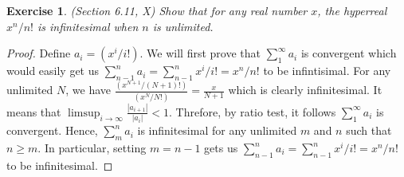 \documentclass[a4paper, 11pt]{book}
\theoremstyle{plain}
\newtheorem{exercise}{Exercise}[chapter]
\theoremstyle{plain}
\newcommand{\arr}{\rightarrow}
\begin{document}
  \begin{exercise}
    (Section 6.11, X)
     Show that for any real number $x$, the hyperreal $x^n/n!$ is infinitesimal when $n$ is unlimited.
  \end{exercise}
  \begin{proof}
    Define $a_i=(x^i/i!)$. We will first prove that $\sum_{1}^\infty a_i$ is convergent which would easily get us $\sum_{n-1}^n a_i= \sum_{n-1}^n x^i/i!=x^n/n!$ to be infintisimal. For any unlimited $N$, we have $\frac{(x^{N+1}/(N+1)!)}{(x^N/N!)}=\frac{x}{N+1}$ which is clearly infinitesimal. It means that $\limsup_{i \arr \infty} \frac{|a_{i+1}|}{|a_i|}<1$. Threfore, by ratio test, it follows $\sum_{1}^{\infty} a_i$ is convergent. Hence, $\sum_{m}^n a_i$ is infinitesimal for any unlimited $m$ and $n$ such that $n \geq m$. In particular, setting $m=n-1$ gets us $\sum_{n-1}^n a_i= \sum_{n-1}^n x^i/i!=x^n/n!$ to be infinitesimal. 
  \end{proof}
\end{document}
